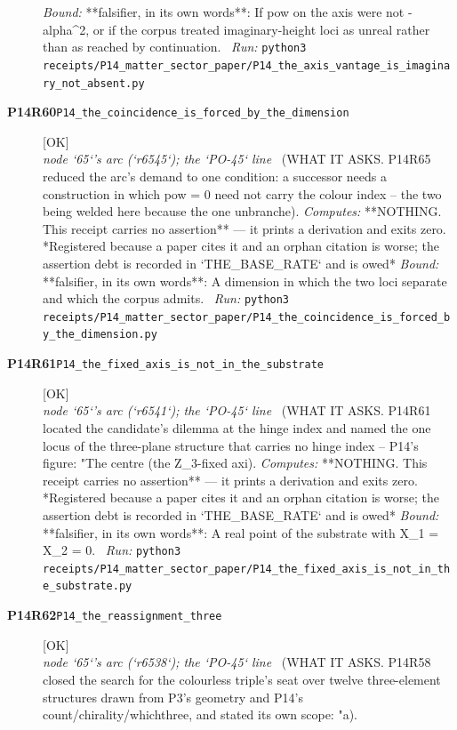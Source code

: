 \begin{description}
 \emph{Bound:} **falsifier, in its own words**: If pow on the axis were not -alpha\textasciicircum{}2, or if the corpus treated imaginary-height loci as unreal rather than as reached by continuation.
\ \emph{Run:} \texttt{python3 receipts/P14\_matter\_sector\_paper/P14\_the\_axis\_vantage\_is\_imaginary\_not\_absent.py}
\item[\rcptlabel{P14_the_coincidence_is_forced_by_the_dimension}{P14R60}\textbf{P14R60}\quad\texttt{P14\_the\_coincidence\_is\_forced\_by\_the\_dimension}]\hfill\textsf{[OK]}\\
\textit{node `65`'s arc (`r6545`); the `PO-45` line} \ (WHAT IT ASKS. P14R65 reduced the arc's demand to one condition: a successor needs a construction in which pow = 0 need not carry the colour index -- the two being welded here because the one unbranche). 
\emph{Computes:}  **NOTHING. This receipt carries no assertion** --- it prints a derivation and exits zero. *Registered because a paper cites it and an orphan citation is worse; the assertion debt is recorded in `THE\_BASE\_RATE` and is owed*
 \emph{Bound:} **falsifier, in its own words**: A dimension in which the two loci separate and which the corpus admits.
\ \emph{Run:} \texttt{python3 receipts/P14\_matter\_sector\_paper/P14\_the\_coincidence\_is\_forced\_by\_the\_dimension.py}
\item[\rcptlabel{P14_the_fixed_axis_is_not_in_the_substrate}{P14R61}\textbf{P14R61}\quad\texttt{P14\_the\_fixed\_axis\_is\_not\_in\_the\_substrate}]\hfill\textsf{[OK]}\\
\textit{node `65`'s arc (`r6541`); the `PO-45` line} \ (WHAT IT ASKS. P14R61 located the candidate's dilemma at the hinge index and named the one locus of the three-plane structure that carries no hinge index -- P14's figure: "The centre (the Z\_3-fixed axi). 
\emph{Computes:}  **NOTHING. This receipt carries no assertion** --- it prints a derivation and exits zero. *Registered because a paper cites it and an orphan citation is worse; the assertion debt is recorded in `THE\_BASE\_RATE` and is owed*
 \emph{Bound:} **falsifier, in its own words**: A real point of the substrate with X\_1 = X\_2 = 0.
\ \emph{Run:} \texttt{python3 receipts/P14\_matter\_sector\_paper/P14\_the\_fixed\_axis\_is\_not\_in\_the\_substrate.py}
\item[\rcptlabel{P14_the_reassignment_three}{P14R62}\textbf{P14R62}\quad\texttt{P14\_the\_reassignment\_three}]\hfill\textsf{[OK]}\\
\textit{node `65`'s arc (`r6538`); the `PO-45` line} \ (WHAT IT ASKS. P14R58 closed the search for the colourless triple's seat over twelve three-element structures drawn from P3's geometry and P14's count/chirality/whichthree, and stated its own scope: "a). 

\end{description}
